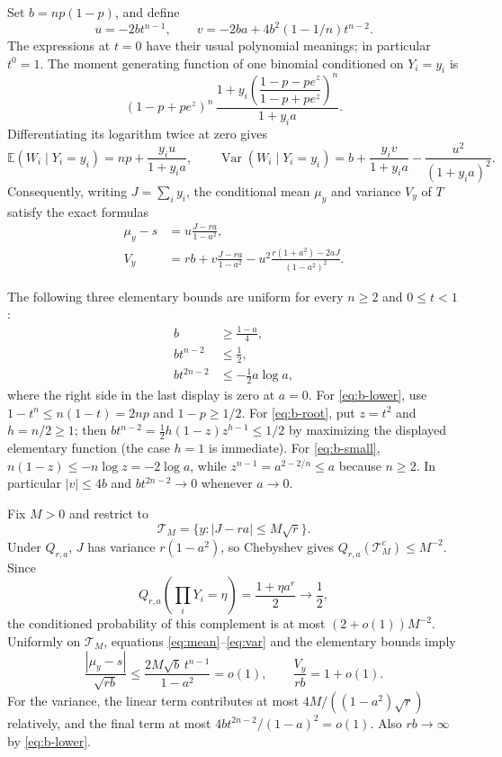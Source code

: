 \documentclass[11pt]{article}
\newcommand{\E}{\mathbb E}
\newcommand{\Var}{\operatorname{Var}}
\begin{document}
Set $b=np(1-p)$, and define
\[
 u=-2b t^{n-1},\qquad
 v=-2ba+4b^2(1-1/n)t^{n-2}.
\]
The expressions at $t=0$ have their usual polynomial meanings; in
particular $t^0=1$. The moment generating function of one binomial
conditioned on $Y_i=y_i$ is
\[
 (1-p+pe^z)^n\,
 \frac{1+y_i\left(\dfrac{1-p-pe^z}{1-p+pe^z}\right)^n}{1+y_i a}.
\]
Differentiating its logarithm twice at zero gives
\[
 \E(W_i\mid Y_i=y_i)=np+\frac{y_i u}{1+y_i a},\qquad
 \Var(W_i\mid Y_i=y_i)=b+\frac{y_i v}{1+y_i a}
 -\frac{u^2}{(1+y_i a)^2}.
\]
Consequently, writing $J=\sum_i y_i$, the conditional mean $\mu_y$ and
variance $V_y$ of $T$ satisfy the exact formulas
\begin{align}
 \mu_y-s&=u\frac{J-ra}{1-a^2},\label{eq:mean}\\
 V_y&=rb+v\frac{J-ra}{1-a^2}
 -u^2\frac{r(1+a^2)-2aJ}{(1-a^2)^2}.\label{eq:var}
\end{align}

The following three elementary bounds are uniform for every $n\ge2$ and
$0\le t<1$:
\begin{align}
 b&\ge\frac{1-a}{4},\label{eq:b-lower}\\
 b t^{n-2}&\le\frac12,\label{eq:b-root}\\
 b t^{2n-2}&\le-\frac12a\log a,\label{eq:b-small}
\end{align}
where the right side in the last display is zero at $a=0$. For
\eqref{eq:b-lower}, use $1-t^n\le n(1-t)=2np$ and $1-p\ge1/2$.
For \eqref{eq:b-root}, put $z=t^2$ and $h=n/2\ge1$; then
$bt^{n-2}=\tfrac12h(1-z)z^{h-1}\le1/2$ by maximizing the displayed
elementary function (the case $h=1$ is immediate). For
\eqref{eq:b-small}, $n(1-z)\le-n\log z=-2\log a$, while
$z^{n-1}=a^{2-2/n}\le a$ because $n\ge2$.
In particular $|v|\le4b$ and $bt^{2n-2}\to0$ whenever $a\to0$.

Fix $M>0$ and restrict to
\[
 \mathcal T_M=\{y:|J-ra|\le M\sqrt r\}.
\]
Under $Q_{r,a}$, $J$ has variance $r(1-a^2)$, so Chebyshev gives
$Q_{r,a}(\mathcal T_M^c)\le M^{-2}$. Since
\[
 Q_{r,a}(\textstyle\prod_iY_i=\eta)=\frac{1+\eta a^r}{2}\to\frac12,
\]
the conditioned probability of this complement is at most
$(2+o(1))M^{-2}$.
Uniformly on $\mathcal T_M$, equations \eqref{eq:mean}--\eqref{eq:var}
and the elementary bounds imply
\[
 \frac{|\mu_y-s|}{\sqrt{rb}}
 \le\frac{2M\sqrt b\,t^{n-1}}{1-a^2}=o(1),
 \qquad
 \frac{V_y}{rb}=1+o(1).
\]
For the variance, the linear term contributes at most
$4M/((1-a^2)\sqrt r)$ relatively, and the final term at most
$4bt^{2n-2}/(1-a)^2=o(1)$. Also $rb\to\infty$ by
\eqref{eq:b-lower}.
\end{document}
